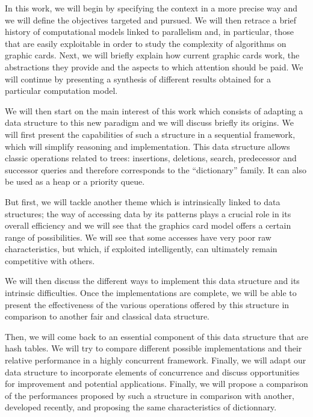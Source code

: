In this work, we will begin by specifying the context in a more precise way and we will define the objectives targeted and pursued. We will then retrace a brief history of computational models linked to parallelism and, in particular, those that are easily exploitable in order to study the complexity of algorithms on graphic cards. Next, we will briefly explain how current graphic cards work, the abstractions they provide and the aspects to which attention should be paid. We will continue by presenting a synthesis of different results obtained for a particular computation model.

We will then start on the main interest of this work which consists of adapting a data structure to this new paradigm and we will discuss briefly its origins. We will first present the capabilities of such a structure in a sequential framework, which will simplify reasoning and implementation. This data structure allows classic operations related to trees: insertions, deletions, search, predecessor and successor queries and therefore corresponds to the ``dictionary'' family. It can also be used as a heap or a priority queue.

But first, we will tackle another theme which is intrinsically linked to data structures; the way of accessing data by its patterns plays a crucial role in its overall efficiency and we will see that the graphics card model offers a certain range of possibilities. We will see that some accesses have very poor raw characteristics, but which, if exploited intelligently, can ultimately remain competitive with others.

We will then discuss the different ways to implement this data structure and its intrinsic difficulties. Once the implementations are complete, we will be able to present the effectiveness of the various operations offered by this structure in comparison to another fair and classical data structure.

Then, we will come back to an essential component of this data structure that are hash tables. We will try to compare different possible implementations and their relative performance in a highly concurrent framework. Finally, we will adapt our data structure to incorporate elements of concurrence and discuss opportunities for improvement and potential applications. Finally, we will propose a comparison of the performances proposed by such a structure in comparison with another, developed recently, and proposing the same characteristics of dictionnary.

